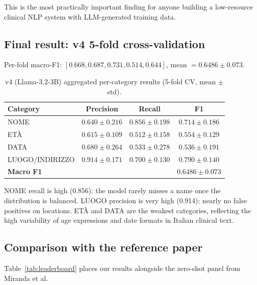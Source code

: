 \documentclass[11pt,a4paper]{article}
\begin{document}
This is the most practically important finding for anyone building a low-resource clinical NLP system with LLM-generated training data.

\subsection{Final result: v4 5-fold cross-validation}

Per-fold macro-F1: $[0.668, 0.687, 0.731, 0.514, 0.644]$, mean $= 0.6486 \pm 0.073$.

\begin{table}[h]
\centering
\caption{v4 (Llama-3.2-3B) aggregated per-category results (5-fold CV, mean $\pm$ std).}
\label{tab:v4-categories}
\begin{tabular}{lccc}
\toprule
Category & Precision & Recall & \textbf{F1} \\
\midrule
NOME              & $0.640 \pm 0.216$ & $0.856 \pm 0.198$ & $0.714 \pm 0.186$ \\
ETÀ               & $0.615 \pm 0.109$ & $0.512 \pm 0.158$ & $0.554 \pm 0.129$ \\
DATA              & $0.680 \pm 0.264$ & $0.533 \pm 0.278$ & $0.536 \pm 0.191$ \\
LUOGO/INDIRIZZO   & $0.914 \pm 0.171$ & $0.700 \pm 0.130$ & $0.790 \pm 0.140$ \\
\midrule
\textbf{Macro F1} & & & $\mathbf{0.6486 \pm 0.073}$ \\
\bottomrule
\end{tabular}
\end{table}

NOME recall is high (0.856): the model rarely misses a name once the distribution is balanced. LUOGO precision is very high (0.914): nearly no false positives on locations. ETÀ and DATA are the weakest categories, reflecting the high variability of age expressions and date formats in Italian clinical text.

\subsection{Comparison with the reference paper}

Table~\ref{tab:leaderboard} places our results alongside the zero-shot panel from Miranda et al.
\end{document}
